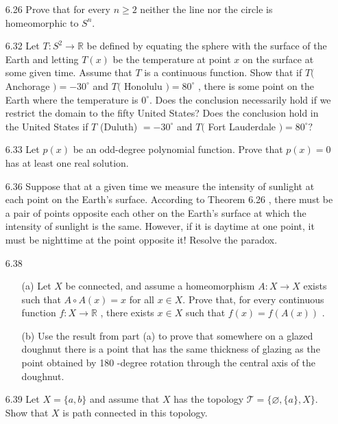 \documentclass[12pt]{article}
\begin{document}
\begin{enumerate}
		\item[6.26] Prove that for every $n \geq 2$ neither the line nor the circle is homeomorphic to	$S ^ { n } .$
		
		\item[6.32] Let $T : S ^ { 2 } \rightarrow \mathbb { R }$ be defined by equating the sphere with the surface of the Earth
		and letting $T ( x )$ be the temperature at point $x$ on the surface at some given time.
		Assume that $T$ is a continuous function. Show that if $T ($ Anchorage $) = - 30 ^ { \circ }$ and $T ($ Honolulu $) = 80 ^ { \circ }$ , there is some point on the Earth where the temperature	is $0 ^ { \circ } .$ Does the conclusion necessarily hold if we restrict the domain to the fifty United States? Does the conclusion hold in the United States if $T$ (Duluth) $=- 30 ^ { \circ }$ and $T ($ Fort Lauderdale $) = 80 ^ { \circ } ?$
		
		\item[6.33] Let $p ( x )$ be an odd-degree polynomial function. Prove that $p ( x ) = 0$ has at least one real solution.
		
		\item[6.36] Suppose that at a given time we measure the intensity of sunlight at each point on the Earth's surface. According to Theorem 6.26 , there must be a pair of points
		opposite each other on the Earth's surface at which the intensity of sunlight is the same. However, if it is daytime at one point, it must be nighttime at the
		point opposite it! Resolve the paradox.
		
		\item[6.38] \begin{enumerate}
			\item[(a)] Let $X$ be connected, and assume a homeomorphism $A : X \rightarrow X$ exists
			such that $A \circ A ( x ) = x$ for all $x \in X .$ Prove that, for every continuous
			function $f : X \rightarrow \mathbb { R }$ , there exists $x \in X$ such that $f ( x ) = f ( A ( x ) )$ .
			\item[(b)] Use the result from part (a) to prove that somewhere on a glazed doughnut
			there is a point that has the same thickness of glazing as the point obtained
			by 180 -degree rotation through the central axis of the doughnut. 
		\end{enumerate}
		
		\item[6.39] Let $X = \{ a , b \}$ and assume that $X$ has the topology $\mathcal { T } = \{ \varnothing , \{ a \} , X \} .$ Show
		that $X$ is path connected in this topology.
		

\end{enumerate}
\end{document}
